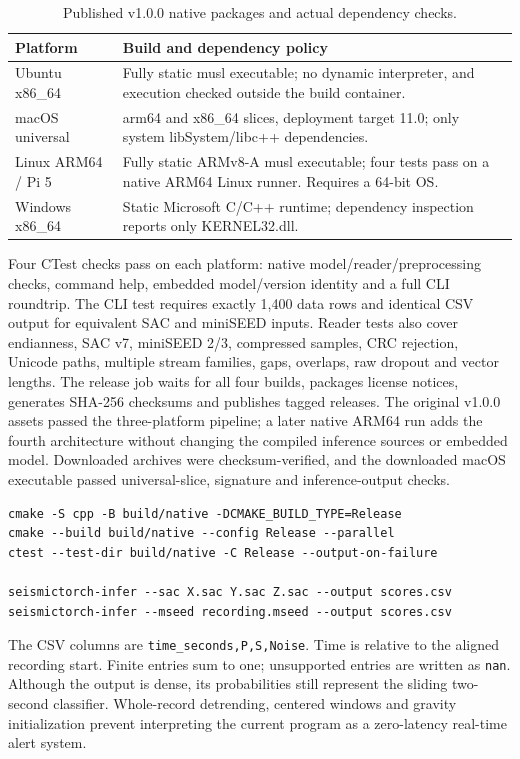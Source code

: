 \documentclass[a4paper,11pt,oneside]{article}
\newcommand{\code}[1]{\nolinkurl{#1}}
\begin{document}
\begin{table}[htbp]\centering\small
\caption{Published v1.0.0 native packages and actual dependency checks.}
\begin{tabularx}{\linewidth}{lY}
\toprule Platform & Build and dependency policy \\\midrule
Ubuntu x86\_64 & Fully static musl executable; no dynamic interpreter, and execution checked outside the build container. \\
macOS universal & arm64 and x86\_64 slices, deployment target 11.0; only system libSystem/libc++ dependencies. \\
Linux ARM64 / Pi 5 & Fully static ARMv8-A musl executable; four tests pass on a native ARM64 Linux runner. Requires a 64-bit OS. \\
Windows x86\_64 & Static Microsoft C/C++ runtime; dependency inspection reports only KERNEL32.dll. \\\bottomrule
\end{tabularx}
\end{table}

Four CTest checks pass on each platform: native model/reader/preprocessing
checks, command help, embedded model/version identity and a full CLI
roundtrip. The CLI test requires exactly 1,400 data rows and identical CSV
output for equivalent SAC and miniSEED inputs. Reader tests also cover
endianness, SAC v7, miniSEED 2/3, compressed samples, CRC rejection, Unicode
paths, multiple stream families, gaps, overlaps, raw dropout and vector
lengths. The release job waits for all four builds, packages license notices,
generates SHA-256 checksums and publishes tagged releases. The original
v1.0.0 assets passed the three-platform pipeline; a later native ARM64 run
adds the fourth architecture without changing the compiled inference sources
or embedded model. Downloaded archives were
checksum-verified, and the downloaded macOS executable passed universal-slice,
signature and inference-output checks.

\begin{lstlisting}
cmake -S cpp -B build/native -DCMAKE_BUILD_TYPE=Release
cmake --build build/native --config Release --parallel
ctest --test-dir build/native -C Release --output-on-failure

seismictorch-infer --sac X.sac Y.sac Z.sac --output scores.csv
seismictorch-infer --mseed recording.mseed --output scores.csv
\end{lstlisting}

The CSV columns are \code{time_seconds,P,S,Noise}. Time is relative to the
aligned recording start. Finite entries sum to one; unsupported entries are
written as \code{nan}. Although the output is dense, its probabilities still
represent the sliding two-second classifier. Whole-record detrending,
centered windows and gravity initialization prevent interpreting the current
program as a zero-latency real-time alert system.
\FloatBarrier
\end{document}
